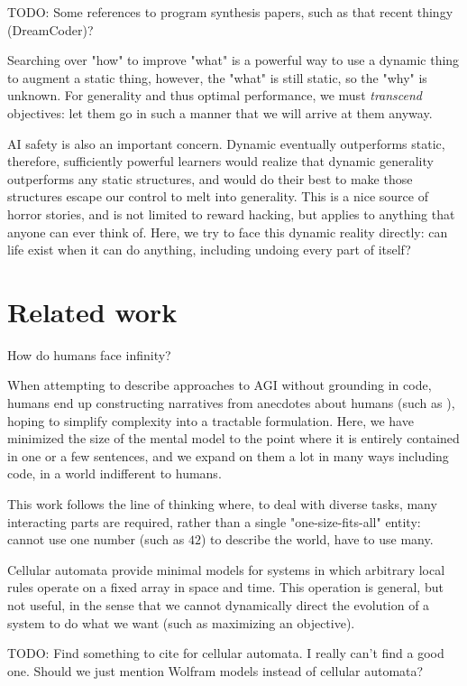 \documentclass{article}
\begin{document}
        TODO: Some references to program synthesis papers, such as that recent thingy (DreamCoder)?

Searching over "how" to improve "what" is a powerful way to use a dynamic thing to augment a static thing, however, the "what" is still static, so the "why" is unknown. For generality and thus optimal performance, we must \textit{transcend} objectives: let them go in such a manner that we will arrive at them anyway.

AI safety is also an important concern. Dynamic eventually outperforms static, therefore, sufficiently powerful learners would realize that dynamic generality outperforms any static structures, and would do their best to make those structures escape our control to melt into generality. This is a nice source of horror stories, and is not limited to reward hacking, but applies to anything that anyone can ever think of. Here, we try to face this dynamic reality directly: can life exist when it can do anything, including undoing every part of itself?

\section{Related work}

How do humans face infinity?

When attempting to describe approaches to AGI without grounding in code, humans end up constructing narratives from anecdotes about humans (such as \cite{DBLP:journals/corr/abs-2102-03406}), hoping to simplify complexity into a tractable formulation. Here, we have minimized the size of the mental model to the point where it is entirely contained in one or a few sentences, and we expand on them a lot in many ways including code, in a world indifferent to humans.

This work follows the line of thinking \cite{10.5555/22939} \cite{fodor1983modularity} where, to deal with diverse tasks, many interacting parts are required, rather than a single "one-size-fits-all" entity: cannot use one number (such as $42$) to describe the world, have to use many.

Cellular automata provide minimal models for systems in which arbitrary local rules operate on a fixed array in space and time. This operation is general, but not useful, in the sense that we cannot dynamically direct the evolution of a system to do what we want (such as maximizing an objective).

    TODO: Find something to cite for cellular automata. I really can't find a good one. Should we just mention Wolfram models instead of cellular automata?
\end{document}
